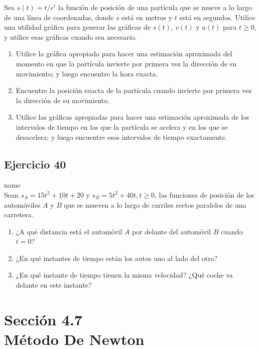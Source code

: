 \documentclass[12pt]{article}
\begin{document}
Sea $s(t) = t /e^t$ la función de posición de una partícula que se mueve a lo largo de una línea de coordenadas, donde $s$ está en metros y $t$ está en segundos. Utilice una utilidad gráfica para generar las gráficas de $s(t)$, $v(t)$ y $a(t)$ para $t \geq 0$, y utilice esas gráficas cuando sea necesario.
\begin{enumerate}[label=(\alph*)]
\item Utilice la gráfica apropiada para hacer una estimación aproximada del momento en que la partícula invierte por primera vez la dirección de su movimiento; y luego encuentre la hora exacta.
\item Encuentre la posición exacta de la partícula cuando invierte por primera vez la dirección de su movimiento.
\item Utilice las gráficas apropiadas para hacer una estimación aproximada de los intervalos de tiempo en los que la partícula se acelera y en los que se desacelera; y luego encuentre esos intervalos de tiempo exactamente.
\end{enumerate}
    
\subsection{Ejercicio 40} name \\

Sean $s_A = 15t^2 + 10t + 20$ y $s_B = 5t^2 + 40t, t \geq 0$, las funciones de posición de los automóviles $A$ y $B$ que se mueven a lo largo de carriles rectos paralelos de una carretera.

\begin{enumerate}[label=(\alph*)]
\item ¿A qué distancia está el automóvil $A$ por delante del automóvil $B$ cuando $t = 0$?
\item ¿En qué instantes de tiempo están los autos uno al lado del otro?
\item ¿En qué instante de tiempo tienen la misma velocidad? ¿Qué coche va delante en este instante?
\end{enumerate}

\section{Sección 4.7 \\ Método De Newton}
\end{document}
